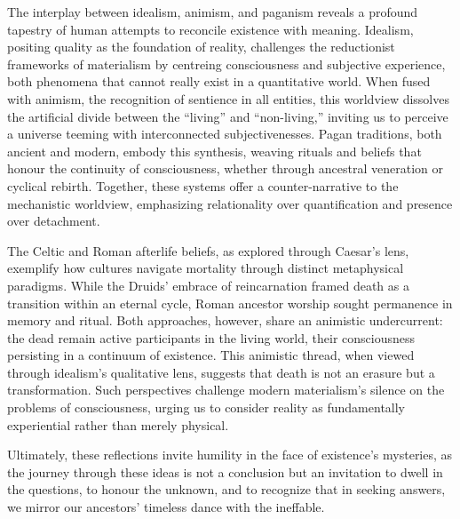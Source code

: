 The interplay between idealism, animism, and paganism reveals a profound tapestry of human
attempts to reconcile existence with meaning. Idealism, positing quality as the foundation
of reality, challenges the reductionist frameworks of materialism by centreing consciousness
and subjective experience, both phenomena that cannot really exist in a quantitative world.
When fused with animism, the recognition of sentience in all entities, this worldview dissolves
the artificial divide between the “living” and “non-living,” inviting us to perceive a universe
teeming with interconnected subjectivenesses. Pagan traditions, both ancient and modern, embody
this synthesis, weaving rituals and beliefs that honour the continuity of consciousness, whether
through ancestral veneration or cyclical rebirth. Together, these systems offer a counter-narrative
to the mechanistic worldview, emphasizing relationality over quantification and presence over detachment.

The Celtic and Roman afterlife beliefs, as explored through Caesar's lens, exemplify how cultures
navigate mortality through distinct metaphysical paradigms. While the Druids' embrace of reincarnation
framed death as a transition within an eternal cycle, Roman ancestor worship sought permanence in
memory and ritual. Both approaches, however, share an animistic undercurrent: the dead remain active
participants in the living world, their consciousness persisting in a continuum of existence. This
animistic thread, when viewed through idealism's qualitative lens, suggests that death is not an
erasure but a transformation. Such perspectives challenge modern materialism's silence on the
problems of consciousness, urging us to consider reality as fundamentally experiential rather than
merely physical.

Ultimately, these reflections invite humility in the face of existence's mysteries, as the journey
through these ideas is not a conclusion but an invitation to dwell in the questions, to honour the
unknown, and to recognize that in seeking answers, we mirror our ancestors' timeless dance with the
ineffable.